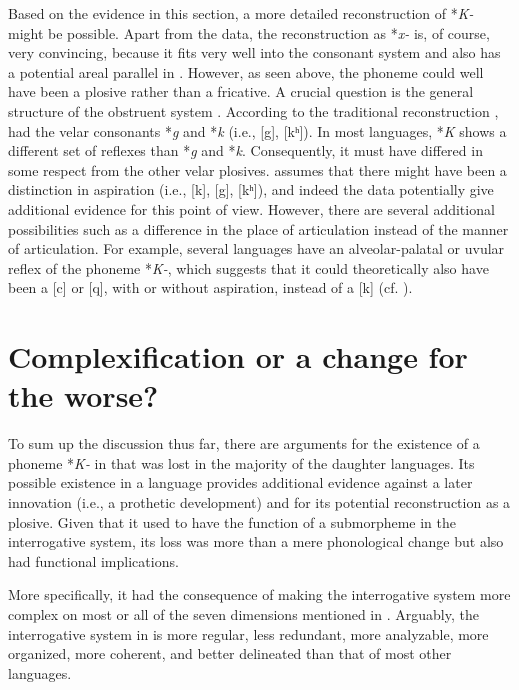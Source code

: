 \documentclass[output=paper,hidelinks]{langscibook}
\begin{document}
Based on the evidence in this section, a more detailed reconstruction of *\textit{K-} might be possible. Apart from the  data, the reconstruction as *\textit{x-} is, of course, very convincing, because it fits very well into the  consonant system and also has a potential areal parallel in  \citep{Janhunen2017}. However, as seen above, the phoneme could well have been a plosive rather than a fricative. A crucial question is the general structure of the  obstruent system \citep{Rozycki1993,Janhunen2017}. According to the traditional reconstruction \citep[27]{Benzing1956},  had the velar consonants *\textit{g} and *\textit{k} (i.e., [g], [kʰ]). In most languages, *\textit{K} shows a different set of reflexes than *\textit{g} and *\textit{k}. Consequently, it must have differed in some respect from the other velar plosives. \citet[211]{Rozycki1993} assumes that there might have been a distinction in aspiration (i.e., [k], [g], [kʰ]), and indeed the  data potentially give additional evidence for this point of view. However, there are several additional possibilities such as a difference in the place of articulation instead of the manner of articulation. For example, several languages have an alveolar-palatal or uvular reflex of the phoneme *\textit{K-}, which suggests that it could theoretically also have been a [c] or [q], with or without aspiration, instead of a [k] (cf. \citealt{Cincius1975}).


\section{Complexification or a change for the worse?}\label{sec4}

To sum up the discussion thus far, there are arguments for the existence of a phoneme *\textit{K-} in  that was lost in the majority of the daughter languages. Its possible existence in a  language provides additional evidence against a later innovation (i.e., a prothetic development) and for its potential reconstruction as a plosive. Given that it used to have the function of a submorpheme in the interrogative system, its loss was more than a mere phonological change but also had functional implications.

More specifically, it had the consequence of making the interrogative system more complex on most or all of the seven dimensions mentioned in . Arguably, the interrogative system in  is more regular, less redundant, more analyzable, more organized, more coherent, and better delineated than that of most other  languages.
\end{document}
